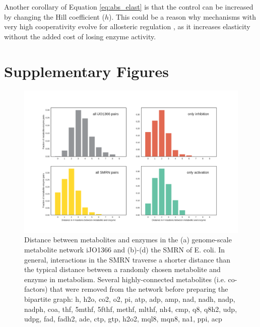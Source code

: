 \documentclass[12pt,a4paper]{article}
\begin{document}
Another corollary of Equation \ref{eq:abs_elast} is that the control can be increased by changing the Hill coefficient ($h$). This could be a reason why mechanisms with very high cooperativity evolve for allosteric regulation \cite{Monod1965-dq}, as it increases elasticity without the added cost of losing enzyme activity.



\clearpage

\section{Supplementary Figures}

\begin{figure}[ht!]
\includegraphics[width=\textwidth]{../manuscript/figS1.pdf}
\caption{Distance between metabolites and enzymes in the (a) genome-scale metabolite network iJO1366 and (b)-(d) the SMRN of E. coli. In general, interactions in the SMRN traverse a shorter distance than the typical distance between a randomly chosen metabolite and enzyme in metabolism. Several highly-connected metabolites (i.e. co-factors) that were removed from the network before preparing the bipartite graph: h, h2o, co2, o2, pi, atp, adp, amp, nad, nadh, nadp, nadph, coa, thf, 5mthf, 5fthf, methf, mlthf, nh4, cmp, q8, q8h2, udp, udpg, fad, fadh2, ade, ctp, gtp, h2o2, mql8, mqn8, na1, ppi, acp
}
\end{figure}
\end{document}
